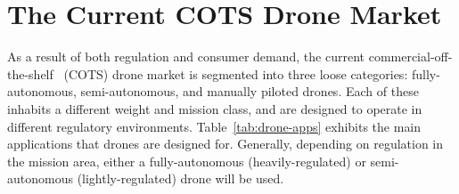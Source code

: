 \section{The Current COTS Drone Market}
\label{sec:current-market}
As a result of both regulation and consumer demand, the current commercial-off-the-shelf~\cite{FAR} (COTS) drone market is segmented into three loose categories: fully-autonomous, semi-autonomous, and manually piloted drones. Each of these inhabits a different weight and mission class, and are designed to operate in different regulatory environments. Table~\ref{tab:drone-apps} exhibits the main applications that drones are designed for. Generally, depending on regulation in the mission area, either a fully-autonomous (heavily-regulated) or semi-autonomous (lightly-regulated) drone will be used. 

